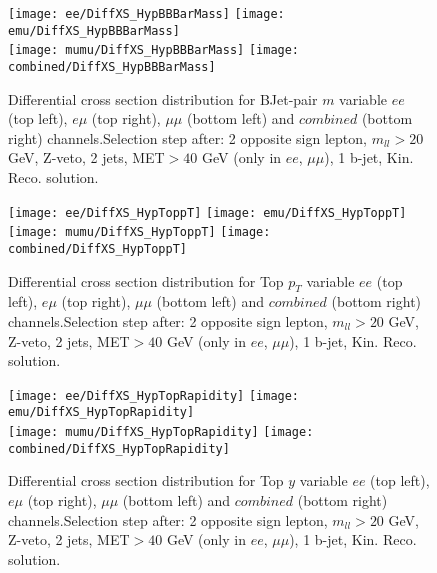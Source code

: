 \clearpage
\newpage


\begin{figure}
  \texttt{[image: ee/DiffXS\_HypBBBarMass]}
  \texttt{[image: emu/DiffXS\_HypBBBarMass]}\\
  \texttt{[image: mumu/DiffXS\_HypBBBarMass]}
  \texttt{[image: combined/DiffXS\_HypBBBarMass]}
\caption{Differential cross section distribution for  BJet-pair $m$ variable  $ee$ (top left), $e\mu$ (top right), $\mu\mu$ (bottom left) and $combined$ (bottom right) channels.\newline Selection step after: 2 opposite sign lepton, $m_{ll}>20$ GeV, Z-veto, 2 jets, MET$>40$ GeV (only in $ee$, $\mu\mu$), 1 b-jet, Kin. Reco. solution.}
\end{figure}

\clearpage
\newpage



\begin{figure}
  \texttt{[image: ee/DiffXS\_HypToppT]}
  \texttt{[image: emu/DiffXS\_HypToppT]}\\
  \texttt{[image: mumu/DiffXS\_HypToppT]}
  \texttt{[image: combined/DiffXS\_HypToppT]}
\caption{Differential cross section distribution for  Top $p_T$ variable  $ee$ (top left), $e\mu$ (top right), $\mu\mu$ (bottom left) and $combined$ (bottom right) channels.\newline Selection step after: 2 opposite sign lepton, $m_{ll}>20$ GeV, Z-veto, 2 jets, MET$>40$ GeV (only in $ee$, $\mu\mu$), 1 b-jet, Kin. Reco. solution.}
\end{figure}

\clearpage
\newpage

\begin{figure}
  \texttt{[image: ee/DiffXS\_HypTopRapidity]}
  \texttt{[image: emu/DiffXS\_HypTopRapidity]}\\
  \texttt{[image: mumu/DiffXS\_HypTopRapidity]}
  \texttt{[image: combined/DiffXS\_HypTopRapidity]}
\caption{Differential cross section distribution for  Top $y$ variable  $ee$ (top left), $e\mu$ (top right), $\mu\mu$ (bottom left) and $combined$ (bottom right) channels.\newline Selection step after: 2 opposite sign lepton, $m_{ll}>20$ GeV, Z-veto, 2 jets, MET$>40$ GeV (only in $ee$, $\mu\mu$), 1 b-jet, Kin. Reco. solution.}
\end{figure}

